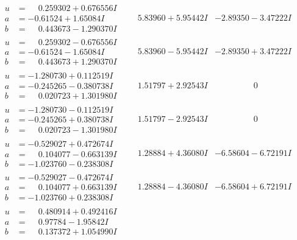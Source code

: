 \documentclass[1p]{elsarticle_modified}
\theoremstyle{definition}
\begin{document}
$$\begin{array}{c|c|c}
\begin{aligned}
u &= \phantom{-}0.259302 + 0.676556 I \\
a &= -0.61524 + 1.65084 I \\
b &= \phantom{-}0.443673 - 1.290370 I\end{aligned}
 & \phantom{-}5.83960 + 5.95442 I & -2.89350 - 3.47222 I \\ \hline\begin{aligned}
u &= \phantom{-}0.259302 - 0.676556 I \\
a &= -0.61524 - 1.65084 I \\
b &= \phantom{-}0.443673 + 1.290370 I\end{aligned}
 & \phantom{-}5.83960 - 5.95442 I & -2.89350 + 3.47222 I \\ \hline\begin{aligned}
u &= -1.280730 + 0.112519 I \\
a &= -0.245265 - 0.380738 I \\
b &= \phantom{-}0.020723 + 1.301980 I\end{aligned}
 & \phantom{-}1.51797 + 2.92543 I & \phantom{-0.000000 } 0 \\ \hline\begin{aligned}
u &= -1.280730 - 0.112519 I \\
a &= -0.245265 + 0.380738 I \\
b &= \phantom{-}0.020723 - 1.301980 I\end{aligned}
 & \phantom{-}1.51797 - 2.92543 I & \phantom{-0.000000 } 0 \\ \hline\begin{aligned}
u &= -0.529027 + 0.472674 I \\
a &= \phantom{-}0.104077 - 0.663139 I \\
b &= -1.023760 - 0.238308 I\end{aligned}
 & \phantom{-}1.28884 + 4.36080 I & -6.58604 - 6.72191 I \\ \hline\begin{aligned}
u &= -0.529027 - 0.472674 I \\
a &= \phantom{-}0.104077 + 0.663139 I \\
b &= -1.023760 + 0.238308 I\end{aligned}
 & \phantom{-}1.28884 - 4.36080 I & -6.58604 + 6.72191 I \\ \hline\begin{aligned}
u &= \phantom{-}0.480914 + 0.492416 I \\
a &= \phantom{-}0.97784 - 1.95842 I \\
b &= \phantom{-}0.137372 + 1.054990 I\end{aligned}

\end{array}$$
\end{document}
